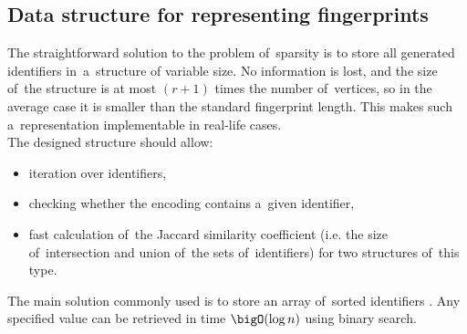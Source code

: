 \subsection{Data structure for representing fingerprints}
The straightforward solution to the problem of~sparsity is to store all generated identifiers in~a~structure of variable size. No information is lost, and the size of~the structure is at most \( (r+1) \) times the number of~vertices, so in the average case it is smaller than the standard fingerprint length. This makes such a~representation implementable in real-life cases. \\
The designed structure should allow:
\begin{itemize}
\singlespacing
    \item iteration over identifiers,
    \item checking whether the encoding contains a~given identifier,
    \item fast calculation of~the Jaccard similarity coefficient (i.\:e. the size of~intersection and union of~the sets of~identifiers) for two structures of~this type.
\end{itemize}
The main solution commonly used is to store an array of~sorted identifiers \cite{chemaxon2025docs}. Any specified value can be retrieved in time \( \bigO(\log n) \) using binary search.


